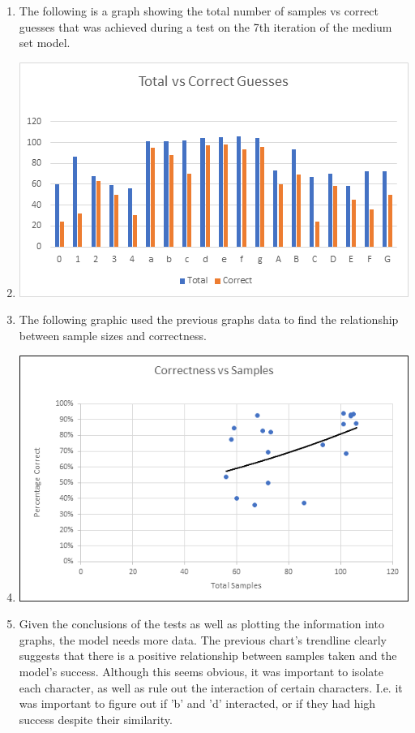 \documentclass[12pt]{article} %
\begin{document}
\begin{enumerate}[label = (\roman*)]
\item The following is a graph showing the total number of samples vs correct guesses that was achieved during a test on the 7th iteration of the medium set model.
\item \includegraphics{charts/total-vs-correct}
\item The following graphic used the previous graphs data to find the relationship between sample sizes and correctness.
\item \includegraphics {charts/correct-vs-samples}
\item Given the conclusions of the tests as well as plotting the information into graphs, the model needs more data. The previous chart's trendline clearly suggests that there is a positive relationship between samples taken and the model's success. Although this seems obvious, it was important to isolate each character, as well as rule out the interaction of certain characters. I.e. it was important to figure out if 'b' and 'd' interacted, or if they had high success despite their similarity.

\end{enumerate}
\end{document}
